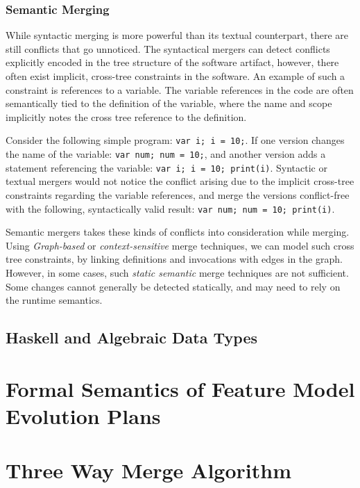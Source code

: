 \documentclass[a4paper,english]{ifimaster}
\begin{document}
\subsection{Semantic Merging}%
\label{sub:semantic_merging}

While syntactic merging is more powerful than its textual counterpart, there are still conflicts that go unnoticed. The syntactical mergers can detect conflicts explicitly encoded in the tree structure of the software artifact, however, there often exist implicit, cross-tree constraints in the software. An example of such a constraint is references to a variable. The variable references in the code are often semantically tied to the definition of the variable, where the name and scope implicitly notes the cross tree reference to the definition.

Consider the following simple program: \texttt{var i; i = 10;}. If one version changes the name of the variable: \texttt{var num; num = 10;}, and another version adds a statement referencing the variable: \texttt{var i; i = 10; print(i)}. Syntactic or textual mergers would not notice the conflict arising due to the implicit cross-tree constraints regarding the variable references, and merge the versions conflict-free with the following, syntactically valid result: \texttt{var num; num = 10; print(i)}.

Semantic mergers takes these kinds of conflicts into consideration while merging. Using \textit{Graph-based}  or \textit{context-sensitive} merge techniques, we can model such cross tree constraints, by linking definitions and invocations with edges in the graph. However, in some cases, such \textit{static semantic} merge techniques are not sufficient. Some changes cannot generally be detected statically, and may need to rely on the runtime semantics.

\section{Haskell and Algebraic Data Types}%
\label{sec:haskell_and_algebraic_data_types}

\chapter{Formal Semantics of Feature Model Evolution Plans}%
\label{cha:formal_semantics_of_feature_model_evolution_plans}

\chapter{Three Way Merge Algorithm}%
\label{cha:three_way_merge_algorithm}
\end{document}
